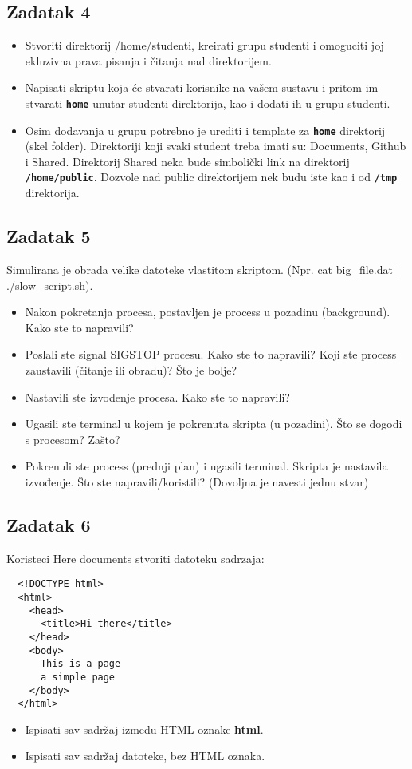 \documentclass[12pt,a4paper]{article}
\newcommand{\shell}[1]{\texttt{\textbf{#1}}}
\begin{document}
	\subsection*{Zadatak 4}
	\begin{itemize}
		\item Stvoriti direktorij /home/studenti, kreirati grupu studenti i omoguciti joj ekluzivna prava pisanja i čitanja nad direktorijem.
    \item Napisati skriptu koja će stvarati korisnike na vašem sustavu i pritom im stvarati \shell{home} unutar studenti direktorija, kao i dodati ih u grupu studenti. 
    \item Osim dodavanja u grupu potrebno je urediti i template za \shell{home} direktorij (skel folder). Direktoriji koji svaki student treba imati su: Documents, Github i Shared. Direktorij Shared neka bude simbolički link na direktorij \shell{/home/public}. Dozvole nad public direktorijem nek budu iste kao i od \shell{/tmp} direktorija.
	\end{itemize}
  
	\subsection*{Zadatak 5}
  Simulirana je obrada velike datoteke vlastitom skriptom. (Npr. cat big\_file.dat | ./slow\_script.sh).
	\begin{itemize}
    \item Nakon pokretanja procesa, postavljen je  process u pozadinu (background). Kako ste to napravili?
    \item Poslali ste signal SIGSTOP procesu. Kako ste to napravili? Koji ste process zaustavili (čitanje ili obradu)? Što je bolje?
    \item Nastavili ste izvodenje procesa. Kako ste to napravili?
    \item Ugasili ste terminal u kojem je pokrenuta skripta (u pozadini). Što se dogodi s procesom? Zašto?
    \item Pokrenuli ste process (prednji plan) i ugasili terminal. Skripta je nastavila izvođenje. Što ste napravili/koristili? (Dovoljna je navesti jednu stvar)
	\end{itemize}

\subsection*{Zadatak 6}
  Koristeci Here documents stvoriti datoteku sadrzaja:
  \begin{verbatim}
  <!DOCTYPE html>
  <html>
    <head>
      <title>Hi there</title>
    </head>
    <body>
      This is a page
      a simple page
    </body>
  </html>
  \end{verbatim}
  \begin{itemize}
    \item Ispisati sav sadržaj izmedu HTML oznake \textbf{html}.
    \item Ispisati sav sadržaj datoteke, bez HTML oznaka.
  \end{itemize}
\end{document}
